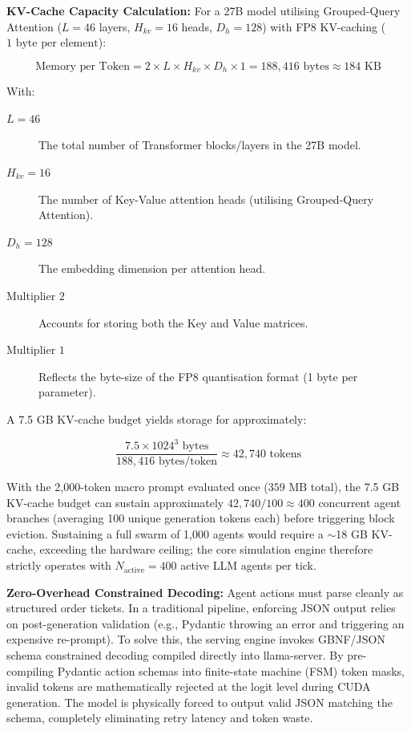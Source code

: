 \documentclass[10pt,a4paper]{article}
\begin{document}
\textbf{KV-Cache Capacity Calculation:} For a 27B model utilising Grouped-Query Attention ($L = 46$ layers, $H_{kv} = 16$ heads, $D_h = 128$) with FP8 KV-caching ($1\text{ byte per element}$):
    
\[ \text{Memory per Token} = 2 \times L \times H_{kv} \times D_h \times 1 = 188,416\text{ bytes} \approx 184\text{ KB} \]
    
With:
\begin{description}
    \item[$L = 46$] The total number of Transformer blocks/layers in the 27B model.
    \item[$H_{kv} = 16$] The number of Key-Value attention heads (utilising Grouped-Query Attention).
    \item[$D_h = 128$] The embedding dimension per attention head.
    \item[Multiplier $2$] Accounts for storing both the Key and Value matrices.
    \item[Multiplier $1$] Reflects the byte-size of the FP8 quantisation format (1 byte per parameter).
\end{description}
    
A 7.5 GB KV-cache budget yields storage for approximately:
    
\[ \frac{7.5 \times 1024^3\text{ bytes}}{188,416\text{ bytes/token}} \approx 42,740\text{ tokens} \]
    
With the 2,000-token macro prompt evaluated once ($359\text{ MB}$ total), the 7.5 GB KV-cache budget can sustain approximately $42{,}740 / 100 \approx 400$ concurrent agent branches (averaging 100 unique generation tokens each) before triggering block eviction. Sustaining a full swarm of 1,000 agents would require a $\sim$18 GB KV-cache, exceeding the hardware ceiling; the core simulation engine therefore strictly operates with $N_{\text{active}} = 400$ active LLM agents per tick.
    
\textbf{Zero-Overhead Constrained Decoding:} Agent actions must parse cleanly as structured order tickets. In a traditional pipeline, enforcing JSON output relies on post-generation validation (e.g., Pydantic throwing an error and triggering an expensive re-prompt). To solve this, the serving engine invokes GBNF/JSON schema constrained decoding compiled directly into llama-server. By pre-compiling Pydantic action schemas into finite-state machine (FSM) token masks, invalid tokens are mathematically rejected at the logit level during CUDA generation. The model is physically forced to output valid JSON matching the schema, completely eliminating retry latency and token waste.
    
\end{document}
